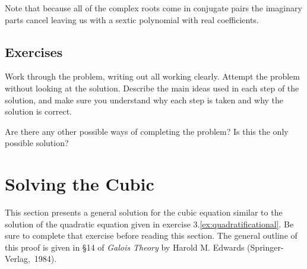 \documentclass[a4paper,10pt,titlepage]{article}
\theoremstyle{definition}
\begin{document}
Note that because all of the complex roots come in conjugate pairs the imaginary parts
cancel leaving us with a sextic polynomial with real coefficients.

\begin{center}\end{center}

\subsection*{Exercises}
Work through the problem, writing out all working clearly. Attempt the problem without
looking at the solution. Describe the main ideas used in each step of the solution,
and make sure you understand why each step is taken and why the solution is correct.

Are there any other possible ways of completing the problem? Is this the only possible
solution?

\section{Solving the Cubic}
This section presents a general solution for the cubic equation similar to the solution
of the quadratic equation given in exercise 3.\ref{ex:quadratificational}. Be sure to complete that
exercise before reading this section. The general outline of this proof is given in \S14
of \emph{Galois Theory} by Harold M. Edwards (Springer-Verlag,~1984).
\end{document}
